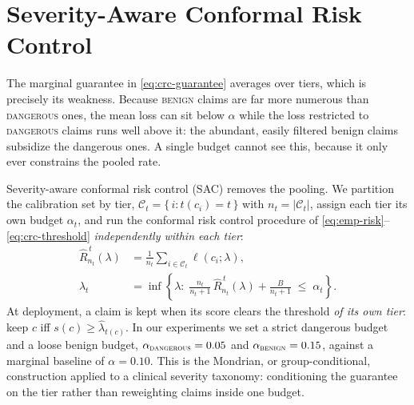 
\section{Severity-Aware Conformal Risk Control}
\label{sec:sac}

The marginal guarantee in \eqref{eq:crc-guarantee} averages over tiers, which is
precisely its weakness. Because \textsc{benign} claims are far more numerous than
\textsc{dangerous} ones, the mean loss can sit below $\alpha$ while the loss
restricted to \textsc{dangerous} claims runs well above it: the abundant, easily
filtered benign claims subsidize the dangerous ones. A single budget cannot see
this, because it only ever constrains the pooled rate.

Severity-aware conformal risk control (SAC) removes the pooling. We partition the
calibration set by tier, $\mathcal{C}_t = \{\, i : t(c_i) = t \,\}$ with
$n_t = |\mathcal{C}_t|$, assign each tier its own budget $\alpha_t$, and run the
conformal risk control procedure of
\eqref{eq:emp-risk}--\eqref{eq:crc-threshold} \emph{independently within each tier}:
\begin{align}
\widehat{R}_{n_t}^{\,t}(\lambda) &= \frac{1}{n_t}\sum_{i \in \mathcal{C}_t}
\ell(c_i; \lambda), \label{eq:sac-risk}\\
\widehat{\lambda}_t &= \inf\left\{ \lambda :\;
\frac{n_t}{n_t+1}\,\widehat{R}_{n_t}^{\,t}(\lambda) + \frac{B}{n_t+1}
\;\le\; \alpha_t \right\}. \label{eq:sac-threshold}
\end{align}
At deployment, a claim is kept when its score clears the threshold \emph{of its own
tier}: keep $c$ iff $s(c) \ge \widehat{\lambda}_{t(c)}$. In our experiments we set a
strict dangerous budget and a loose benign budget, $\alpha_{\textsc{dangerous}} =
0.05$ and $\alpha_{\textsc{benign}} = 0.15$, against a marginal baseline of
$\alpha = 0.10$. This is the Mondrian, or group-conditional, construction
\citep{vovk2012conditional} applied to a clinical severity taxonomy: conditioning
the guarantee on the tier rather than reweighting claims inside one budget.

